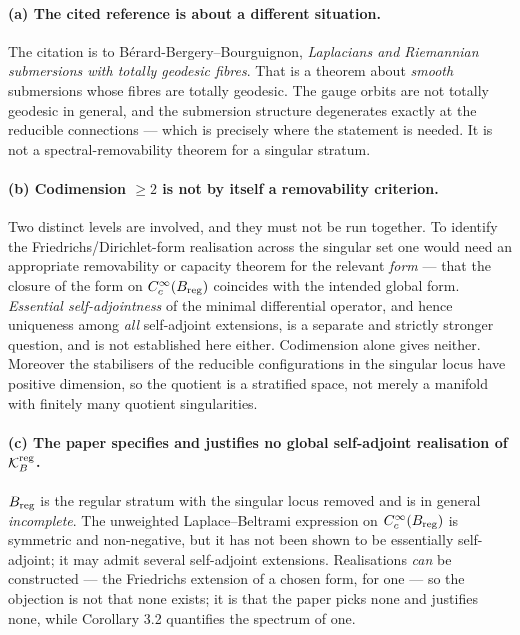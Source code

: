 \documentclass[11pt]{article}
\begin{document}
\paragraph{(a) The cited reference is about a different situation.} The citation is to
Bérard-Bergery--Bourguignon, \emph{Laplacians and Riemannian submersions with totally
geodesic fibres}. That is a theorem about \emph{smooth} submersions whose fibres are
totally geodesic. The gauge orbits are not totally geodesic in general, and the
submersion structure degenerates exactly at the reducible connections --- which is
precisely where the statement is needed. It is not a spectral-removability theorem for
a singular stratum.

\paragraph{(b) Codimension $\ge2$ is not by itself a removability criterion.} Two
distinct levels are involved, and they must not be run together. To identify the
Friedrichs/Dirichlet-form realisation across the singular set one would need an
appropriate removability or capacity theorem for the relevant \emph{form} --- that the
closure of the form on $C_c^\infty(B_{\rm reg})$ coincides with the intended global
form. \emph{Essential self-adjointness} of the minimal differential operator, and hence
uniqueness among \emph{all} self-adjoint extensions, is a separate and strictly stronger
question, and is not established here either. Codimension alone gives neither. Moreover
the stabilisers of the reducible configurations in the singular locus have positive
dimension, so the quotient is a stratified space, not merely a manifold with finitely
many quotient singularities.

\paragraph{(c) The paper specifies and justifies no global self-adjoint realisation of
$\mathcal K_B^{\rm reg}$.} $B_{\rm reg}$ is the regular stratum with the singular locus
removed and is in general \emph{incomplete}. The unweighted Laplace--Beltrami
expression on $C_c^\infty(B_{\rm reg})$ is symmetric and non-negative, but it has not
been shown to be essentially self-adjoint; it may admit several self-adjoint
extensions. Realisations \emph{can} be constructed --- the Friedrichs extension of a
chosen form, for one --- so the objection is not that none exists; it is that the paper
picks none and justifies none, while Corollary 3.2 quantifies the spectrum of one.
\end{document}

